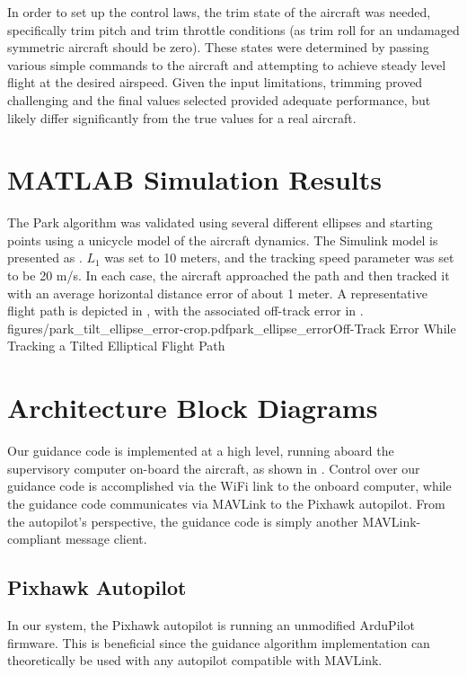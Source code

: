 \documentclass{aiaa}
\begin{document}
In order to set up the control laws, the trim state of the aircraft was needed, specifically trim pitch and trim throttle conditions (as trim roll for an undamaged symmetric aircraft should be zero). These states were determined by passing various simple commands to the aircraft and attempting to achieve steady level flight at the desired airspeed. Given the input limitations, trimming proved challenging and the final values selected provided adequate performance, but likely differ significantly from the true values for a real aircraft.

\section{MATLAB Simulation Results}
The Park algorithm was validated using several different ellipses and starting points using a unicycle model of the aircraft dynamics. The Simulink model is presented as . $L_1$ was set to 10 meters, and the tracking speed parameter was set to be 20 m/s.  In each case, the aircraft approached the path and then tracked it with an average horizontal distance error of about 1 meter. A representative flight path is depicted in , with the associated off-track error in .
{figures/park_tilt_ellipse_error-crop.pdf}{park_ellipse_error}{Off-Track Error While Tracking a Tilted Elliptical Flight Path}
\section{Architecture Block Diagrams}
Our guidance code is implemented at a high level, running aboard the supervisory computer on-board the aircraft, as shown in . Control over our guidance code is accomplished via the WiFi link to the onboard computer, while the guidance code communicates via MAVLink to the Pixhawk autopilot. From the autopilot's perspective, the guidance code is simply another MAVLink-compliant message client. 
\subsection{Pixhawk Autopilot}
In our system, the Pixhawk autopilot is running an unmodified ArduPilot firmware. This is beneficial since the guidance algorithm implementation can theoretically be used with any autopilot compatible with MAVLink.
\end{document}
